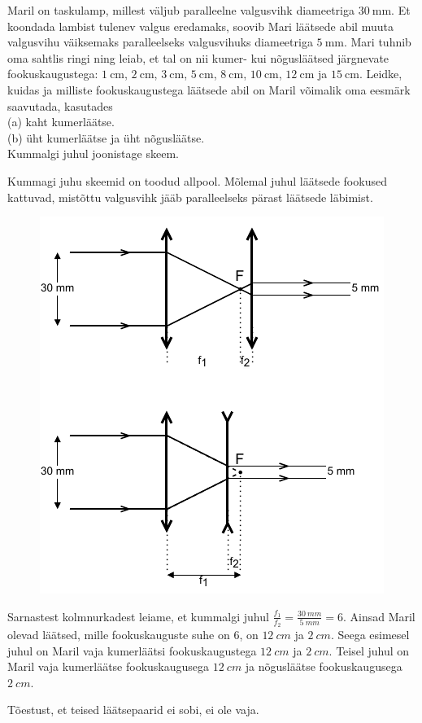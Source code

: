 
Maril on taskulamp, millest väljub paralleelne valgusvihk diameetriga $\SI{30}{\mm}$. Et koondada lambist tulenev valgus eredamaks, soovib Mari läätsede abil muuta valgusvihu väiksemaks paralleelseks valgusvihuks diameetriga $\SI{5}{\mm}$. Mari tuhnib oma sahtlis ringi ning leiab, et tal on nii kumer- kui nõgusläätsed järgnevate fookuskaugustega: $\SI{1}{\cm}$, $\SI{2}{\cm}$, $\SI{3}{\cm}$, $\SI{5}{\cm}$, $\SI{8}{\cm}$, $\SI{10}{\cm}$, $\SI{12}{\cm}$ ja $\SI{15}{\cm}$. Leidke, kuidas ja milliste fookuskaugustega läätsede abil on Maril võimalik oma eesmärk saavutada, kasutades
\\ (a) kaht kumerläätse.
\\ (b) üht kumerläätse ja üht nõgusläätse.
\\ Kummalgi juhul joonistage skeem.


\hint

\solu
Kummagi juhu skeemid on toodud allpool. Mõlemal juhul läätsede fookused kattuvad, mistõttu valgusvihk jääb paralleelseks pärast läätsede läbimist.

\begin{figure}[h]
    \centering
    \includegraphics[width=.5\linewidth]{2023-v2g-01-sol.pdf}
\end{figure}

Sarnastest kolmnurkadest leiame, et kummalgi juhul $\frac{f_1}{f_2} = \frac{\SI{30}{mm}}{\SI{5}{mm}} = 6$. Ainsad Maril olevad läätsed, mille fookuskauguste suhe on $6$, on $\SI{12}{cm}$ ja $\SI{2}{cm}$. Seega esimesel juhul on Maril vaja kumerläätsi fookuskaugustega $\SI{12}{cm}$ ja $\SI{2}{cm}$. Teisel juhul on Maril vaja kumerläätse fookuskaugusega $\SI{12}{cm}$ ja nõgusläätse fookuskaugusega $\SI{2}{cm}$.

Tõestust, et teised läätsepaarid ei sobi, ei ole vaja.
\probend
